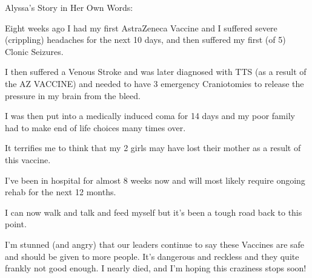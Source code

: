Alyssa’s Story in Her Own Words:

Eight weeks ago I had my first AstraZeneca Vaccine and I suffered severe
(crippling) headaches for the next 10 days, and then suffered my first (of 5)
Clonic Seizures.

I then suffered a Venous Stroke and was later diagnosed with TTS (as a result of
the AZ VACCINE) and needed to have 3 emergency Craniotomies to release the
pressure in my brain from the bleed.

I was then put into a medically induced coma for 14 days and my poor family had
to make end of life choices many times over.

It terrifies me to think that my 2 girls may have lost their mother as a result
of this vaccine.

I’ve been in hospital for almost 8 weeks now and will most likely require
ongoing rehab for the next 12 months.

I can now walk and talk and feed myself but it’s been a tough road back to this
point.

I’m stunned (and angry) that our leaders continue to say these Vaccines are safe
and should be given to more people. It’s dangerous and reckless and they quite
frankly not good enough. I nearly died, and I’m hoping this craziness stops
soon!

